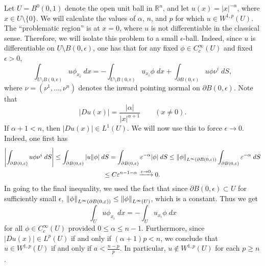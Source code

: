 \documentclass{article}
\numberwithin{equation}{section}
\begin{document}
	\begin{example}
		Let $U = B^{0}(0,1)$ denote the open unit ball in $\mathbb{R}^n$, and let $u(x) = |x|^{-\alpha}$, where $x \in U \setminus \{0\}$. We will calculate the values of $\alpha$, $n$, and $p$ for which $u \in W^{1,p}(U)$. The ``problematic region'' is at $x = 0$, where $u$ is not differentiable in the classical sense. Therefore, we will isolate this problem to a small $\epsilon$-ball. Indeed, since $u$ is differentiable on $U\setminus B(0,\epsilon)$, one has that for any fixed $\phi \in C_c^\infty(U)$ and fixed $\epsilon > 0$, 
		\begin{equation*}
			\int_{U\setminus B(0,\epsilon)}u\phi_{x_{i}}\;dx = -\int_{U \setminus B(0,\epsilon)}u_{x_{i}}\phi\;dx + \int_{\partial B(0, \epsilon)}u\phi \nu^{i}\;dS, 
		\end{equation*}
		where $\nu = (\nu^{1}, \ldots, \nu^{n})$ denotes the inward pointing normal on $\partial B(0,\epsilon)$. Note that 
		\begin{equation*}
			|Du(x)| = \frac{|\alpha|}{|x|^{\alpha + 1}} \qquad (x \neq 0).
		\end{equation*}
		If $\alpha + 1 < n$, then $|Du(x)| \in L^1(U)$. We will now use this to force $\epsilon \to 0$. Indeed, one first has 
		\begin{multline*}
			\left| \int_{\partial B(0,\varepsilon)}u\phi \nu^{i}\;dS \right| \leq \int_{\partial B(0,\varepsilon)}|u\|\phi|\;dS = \int_{\partial B(0,\varepsilon)}\varepsilon^{-\alpha}|\phi|\;dS \leq \left\Vert \phi \right\Vert_{L^\infty(\partial B(0,\varepsilon))}\int_{\partial B(0,\varepsilon)}\varepsilon^{-\alpha}\;dS \\ \leq C\varepsilon^{n-1 -\alpha}\xrightarrow{\varepsilon \to 0}0. 
		\end{multline*}
		In going to the final inequality, we used the fact that since $\partial B(0, \epsilon) \subset U$ for sufficiently small $\epsilon$, $\left\Vert \phi \right\Vert_{L^\infty(\partial B(0,\varepsilon))} \leq \left\Vert \phi \right\Vert_{L^{\infty}(U)}$, which is a constant. Thus we get 
		\begin{equation*}
			\int_{U}u\phi_{x_{i}}\;dx = -\int_{U}u_{x_{i}}\phi\;dx
		\end{equation*}
		for all $\phi \in C_{c}^{\infty}(U)$ provided $0 \leq \alpha \leq n - 1$. Furthermore, since $|Du(x)| \in L^{p}(U)$ if and only if $(\alpha + 1)p < n$, we conclude that $u \in W^{1,p}(U)$ if and only if $a < \frac{n-p}{p}$. In particular, $u \notin W^{1,p}(U)$ for each $p\geq n$. 
	\end{example}
	
\end{document}
